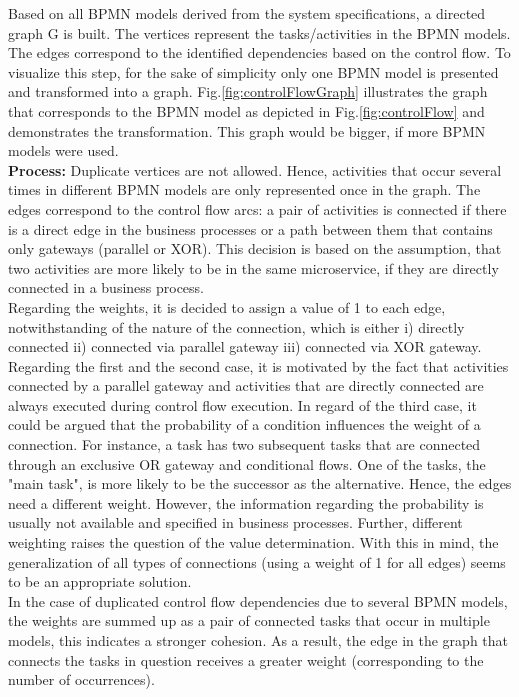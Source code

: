 \noindent
Based on all BPMN models derived from the system specifications, a directed graph G is built.  The vertices represent the tasks/activities in the BPMN models. The edges correspond to the identified dependencies based on the control flow. To visualize this step, for the sake of simplicity only one BPMN model is presented and transformed into a graph. Fig.\ref{fig:controlFlowGraph} illustrates the graph that corresponds to the BPMN model as depicted in Fig.\ref{fig:controlFlow} and demonstrates the transformation. This graph would be bigger, if more BPMN models were used.  \\

\noindent
\textbf{Process:} Duplicate vertices are not allowed. Hence, activities that occur several times in different BPMN models are only represented once in the graph.
The edges correspond to the control flow arcs: a pair of activities is connected if there is a direct edge in the business processes or a path between them that contains only gateways (parallel or XOR). This decision is based on the assumption, that two activities are more likely to be in the same microservice, if they are directly connected in a business process. \\
Regarding the weights, it is decided to assign a value of 1 to each edge, notwithstanding of the nature of the connection, which is either i) directly connected ii) connected via parallel gateway iii) connected via XOR gateway. Regarding the first and the second case, it is motivated by the fact that activities connected by a parallel gateway and activities that are directly connected are always executed during control flow execution.
In regard of the third case, it could be argued that the probability of a condition influences the weight of a connection. For instance, a task has two subsequent tasks that are connected through an exclusive OR gateway and conditional flows. One of the tasks, the "main task", is more likely to be the successor as the alternative. Hence, the edges need a different weight. However, the information regarding the probability is usually not available and specified in business processes. Further, different weighting raises the question of the value determination. With this in mind, the generalization of all types of connections (using a weight of 1 for all edges) seems to be an appropriate solution. \\
In the case of duplicated control flow dependencies due to several BPMN models, the weights are summed up as a pair of connected tasks that occur in multiple models, this indicates a stronger cohesion. As a result, the edge in the graph that connects the tasks in question receives a greater weight (corresponding to the number of occurrences).\\

